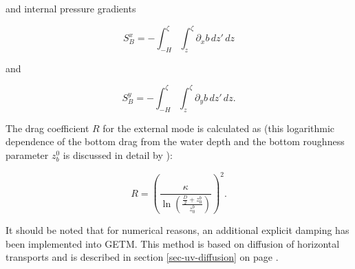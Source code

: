 and internal pressure gradients

\begin{equation}
S^x_B=-\int_{-H}^{\zeta}\int_z^{\zeta}\partial_x b\,dz'\,dz 
\end{equation}

and 

\begin{equation}\label{Slowlast}
S^y_B=-\int_{-H}^{\zeta}\int_z^{\zeta}\partial_y b\,dz'\,dz. 
\end{equation}

The drag coefficient $R$ for the external mode is calculated
as (this logarithmic dependence of the bottom drag from
the water depth and the bottom roughness parameter $z_b^0$ is discussed 
in detail by \cite{BURCHARDea02}):


\begin{equation}\label{bottom_vert}
R = \left(\frac{\kappa}
{\ln\left(\frac{\frac{D}{2}+z^b_0}{z^b_0}\right)}\right)^2.
\end{equation}

It should be noted that for numerical reasons, an additional explicit
damping has been implemented into GETM. This method is based on
diffusion of horizontal transports and is described in section
\ref{sec-uv-diffusion} on page \pageref{sec-uv-diffusion}.
